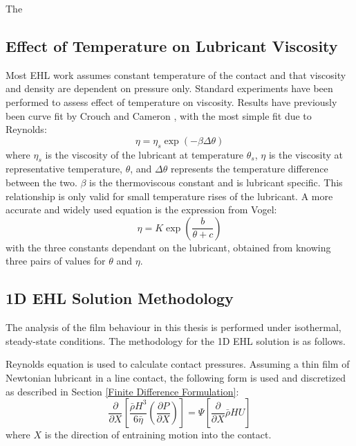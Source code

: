 The 

\subsection{Effect of Temperature on Lubricant Viscosity}

Most EHL work assumes constant temperature of the contact and that viscosity and density are dependent on pressure only. Standard experiments have been performed to assess effect of temperature on viscosity. Results have previously been curve fit by Crouch and Cameron \cite{Crouch1961}, with the most simple fit due to Reynolds:
\begin{equation}\label{eq3.31}
	\eta=\eta_s \exp (-\beta \Delta \theta)
\end{equation}
where $\eta_s$ is the viscosity of the lubricant at temperature $\theta_s$, $\eta$ is the viscosity at representative temperature, $\theta$, and $\Delta \theta$ represents the temperature difference between the two. $\beta$ is the thermoviscous constant and is lubricant specific. This relationship is only valid for small temperature rises of the lubricant. A more accurate and widely used equation is the expression from Vogel:
\begin{equation}\label{eq3.32}
	\eta=K \exp \left(\frac{b}{\theta+c}\right)
\end{equation}
with the three constants dependant on the lubricant, obtained from knowing three pairs of values for $\theta$ and $\eta$.

\subsection{1D EHL Solution Methodology}

The analysis of the film behaviour in this thesis is performed under isothermal, steady-state conditions. The methodology for the 1D EHL solution is as follows.

Reynolds equation is used to calculate contact pressures. Assuming a thin film of Newtonian lubricant in a line contact, the following form is used and discretized as described in Section \ref{Finite Difference Formulation}:
\begin{equation}\label{eq3.33}
	\frac{\partial}{\partial X}\left[\frac{\bar{\rho} H^3}{6 \bar{\eta}}\left(\frac{\partial P}{\partial X}\right)\right]=\Psi\left[\frac{\partial}{\partial X} \bar{\rho} H U\right]
\end{equation}
where $X$ is the direction of entraining motion into the contact. 

